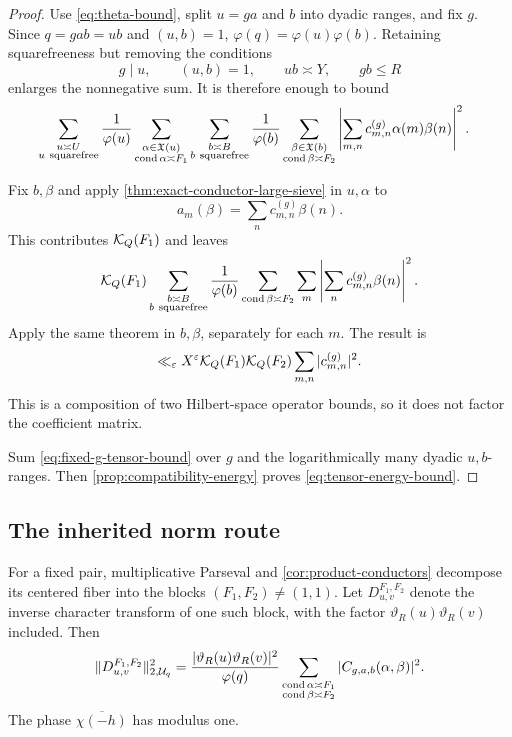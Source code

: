 \begin{proof}
Use \eqref{eq:theta-bound}, split \(u=ga\) and \(b\) into dyadic
ranges, and fix \(g\).  Since \(q=gab=ub\) and \((u,b)=1\),
\(\varphi(q)=\varphi(u)\varphi(b)\).  Retaining squarefreeness but
removing the conditions
\[
 g\mid u,\qquad (u,b)=1,\qquad ub\asymp Y,\qquad gb\le R
\]
enlarges the nonnegative sum.  It is therefore enough to bound
\begin{align}
 &\sum_{\substack{u\asymp U\\u\ {\rm squarefree}}}\frac1{\varphi(u)}
 \sum_{\substack{\alpha\in\mathfrak X(u)\\\operatorname{cond}\alpha\asymp F_1}}
 \sum_{\substack{b\asymp B\\b\ {\rm squarefree}}}\frac1{\varphi(b)}
 \sum_{\substack{\beta\in\mathfrak X(b)\\\operatorname{cond}\beta\asymp F_2}}
 \left|\sum_{m,n}c_{m,n}^{(g)}\alpha(m)\beta(n)\right|^2.
 \label{eq:enlarged-tensor-sum}
\end{align}

Fix \(b,\beta\) and apply
\cref{thm:exact-conductor-large-sieve} in \(u,\alpha\) to
\[
 a_m(\beta)=\sum_n c_{m,n}^{(g)}\beta(n).
\]
This contributes \(\mathcal K_Q(F_1)\) and leaves
\[
 \mathcal K_Q(F_1)
 \sum_{\substack{b\asymp B\\b\ {\rm squarefree}}}\frac1{\varphi(b)}
 \sum_{\operatorname{cond}\beta\asymp F_2}
 \sum_m\left|\sum_nc_{m,n}^{(g)}\beta(n)\right|^2.
\]
Apply the same theorem in \(b,\beta\), separately for each \(m\).
The result is
\begin{equation}
 \ll_\varepsilon X^\varepsilon\mathcal K_Q(F_1)\mathcal K_Q(F_2)
 \sum_{m,n}|c_{m,n}^{(g)}|^2.
 \label{eq:fixed-g-tensor-bound}
\end{equation}
This is a composition of two Hilbert-space operator bounds, so it does
not factor the coefficient matrix.

Sum \eqref{eq:fixed-g-tensor-bound} over \(g\) and the logarithmically
many dyadic \(u,b\)-ranges.  Then
\cref{prop:compatibility-energy} proves
\eqref{eq:tensor-energy-bound}.
\end{proof}

\subsection{The inherited norm route}

For a fixed pair, multiplicative Parseval and
\cref{cor:product-conductors} decompose its centered fiber into the
blocks \((F_1,F_2)\ne(1,1)\).  Let
\(D_{u,v}^{F_1,F_2}\) denote the inverse character transform of one such
block, with the factor
\(\vartheta_R(u)\vartheta_R(v)\) included.  Then
\begin{equation}
 \|D_{u,v}^{F_1,F_2}\|_{2,\mathcal U_q}^2
 =\frac{|\vartheta_R(u)\vartheta_R(v)|^2}{\varphi(q)}
 \sum_{\substack{\operatorname{cond}\alpha\asymp F_1\\
                  \operatorname{cond}\beta\asymp F_2}}
 |C_{g,a,b}(\alpha,\beta)|^2.
 \label{eq:pair-block-parseval}
\end{equation}
The phase \(\overline{\chi(-h)}\) has modulus one.

